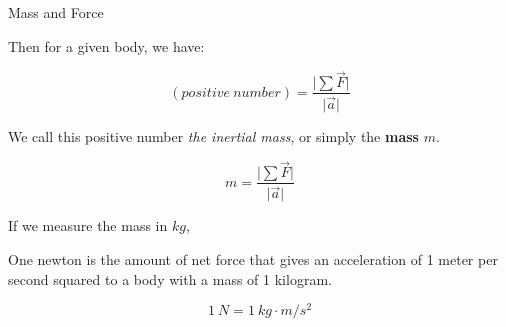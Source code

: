\documentclass[]{beamer}
\begin{document}

\begin{frame}

Mass and Force

\vspace{5mm}
Then for a given body, we have:
\pause

\begin{equation*}
  (positive~number)= \frac{\vert\sum\vec{F}\vert}{\vert\vec{a}\vert}
\end{equation*}
\pause

We call this positive number \textit{the inertial mass}, or simply the
\textbf{mass} $m$.

\pause

\begin{equation}
 \boxed{m= \frac{\vert\sum\vec{F}\vert}{\vert\vec{a}\vert}}
\end{equation}

     \end{frame}



\begin{frame}

If we measure the mass in $kg$, 
\vspace{5mm}

\pause
One newton is the amount of net force that gives an acceleration of 1 meter per
second squared to a body with a mass of 1 kilogram.
\pause
\vspace{5mm}

\begin{equation}
  \boxed{1~N=1~kg\cdot m/s^ 2}
 \end{equation}
  
\end{frame}


\end{document}
